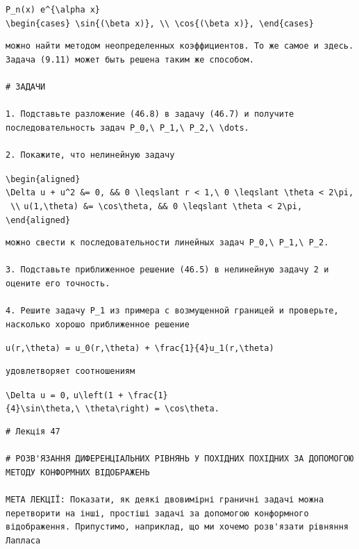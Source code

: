 \documentclass[
  ukrainian,
]{article}
\begin{document}
\texttt{P\_n(x)\ e\^{}\{\textbackslash{}alpha\ x\}}
\texttt{\textbackslash{}begin\{cases\}\ \textbackslash{}sin\{(\textbackslash{}beta\ x)\},\ \textbackslash{}\textbackslash{}\ \textbackslash{}cos\{(\textbackslash{}beta\ x)\},\ \textbackslash{}end\{cases\}}

\begin{verbatim}
можно найти методом неопределенных коэффициентов. То же самое и здесь. Задача (9.11) может быть решена таким же способом.

# ЗАДАЧИ

1. Подставьте разложение (46.8) в задачу (46.7) и получите последовательность задач P_0,\ P_1,\ P_2,\ \dots.

2. Покажите, что нелинейную задачу
\end{verbatim}

\texttt{\textbackslash{}begin\{aligned\}}
\texttt{\textbackslash{}Delta\ u\ +\ u\^{}2\ \&=\ 0,\ \&\&\ 0\ \textbackslash{}leqslant\ r\ \textless{}\ 1,\textbackslash{}\ 0\ \textbackslash{}leqslant\ \textbackslash{}theta\ \textless{}\ 2\textbackslash{}pi,\ \textbackslash{}\textbackslash{}}
\texttt{u(1,\textbackslash{}theta)\ \&=\ \textbackslash{}cos\textbackslash{}theta,\ \&\&\ 0\ \textbackslash{}leqslant\ \textbackslash{}theta\ \textless{}\ 2\textbackslash{}pi,}
\texttt{\textbackslash{}end\{aligned\}}

\begin{verbatim}
можно свести к последовательности линейных задач P_0,\ P_1,\ P_2.

3. Подставьте приближенное решение (46.5) в нелинейную задачу 2 и оцените его точность.

4. Решите задачу P_1 из примера с возмущенной границей и проверьте, насколько хорошо приближенное решение
\end{verbatim}

\texttt{u(r,\textbackslash{}theta)\ =\ u\_0(r,\textbackslash{}theta)\ +\ \textbackslash{}frac\{1\}\{4\}u\_1(r,\textbackslash{}theta)}

\begin{verbatim}
удовлетворяет соотношениям
\end{verbatim}

\texttt{\textbackslash{}Delta\ u\ =\ 0,}
\texttt{u\textbackslash{}left(1\ +\ \textbackslash{}frac\{1\}\{4\}\textbackslash{}sin\textbackslash{}theta,\textbackslash{}\ \textbackslash{}theta\textbackslash{}right)\ =\ \textbackslash{}cos\textbackslash{}theta.}

\begin{verbatim}
# Лекція 47

# РОЗВ'ЯЗАННЯ ДИФЕРЕНЦІАЛЬНИХ РІВНЯНЬ У ПОХІДНИХ ПОХІДНИХ ЗА ДОПОМОГОЮ МЕТОДУ КОНФОРМНИХ ВІДОБРАЖЕНЬ

МЕТА ЛЕКЦІЇ: Показати, як деякі двовимірні граничні задачі можна перетворити на інші, простіші задачі за допомогою конформного відображення. Припустимо, наприклад, що ми хочемо розв'язати рівняння Лапласа
\end{verbatim}
\end{document}
